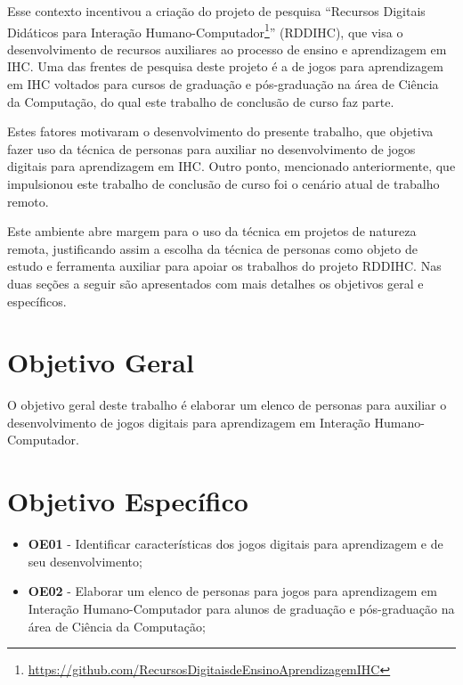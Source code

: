 Esse contexto incentivou a criação do projeto de pesquisa ``Recursos Digitais Didáticos para Interação Humano-Computador\footnote{\url{https://github.com/RecursosDigitaisdeEnsinoAprendizagemIHC}}'' (RDDIHC), que visa o desenvolvimento de recursos auxiliares ao processo de ensino e aprendizagem em IHC. Uma das frentes de pesquisa deste projeto é a de jogos para aprendizagem em IHC voltados para cursos de graduação e pós-graduação na área de Ciência da Computação, do qual este trabalho de conclusão de curso faz parte.

Estes fatores motivaram o desenvolvimento do presente trabalho, que objetiva fazer uso da técnica de personas para auxiliar no desenvolvimento de jogos digitais para aprendizagem em IHC. Outro ponto, mencionado anteriormente, que impulsionou este trabalho de conclusão de curso foi o cenário atual de trabalho remoto. 

Este ambiente abre margem para o uso da técnica em projetos de natureza remota, justificando assim a escolha da técnica de personas como objeto de estudo e ferramenta auxiliar para apoiar os trabalhos do projeto RDDIHC. Nas duas seções a seguir são apresentados com mais detalhes os objetivos geral e específicos.


\section{Objetivo Geral}
\label{sec:objetivos}

O objetivo geral deste trabalho é elaborar um elenco de personas para auxiliar o desenvolvimento de jogos digitais para aprendizagem em Interação Humano-Computador.

\section{Objetivo Específico}
\label{ssec:obj_especifico}
\begin{itemize}

    
     \item \textbf{OE01} - Identificar características dos jogos digitais para aprendizagem e de seu desenvolvimento;
     
     \item \textbf{OE02} - Elaborar um elenco de personas para jogos para aprendizagem em Interação Humano-Computador para alunos de graduação e pós-graduação na área de Ciência da Computação;
    
    
\end{itemize}

